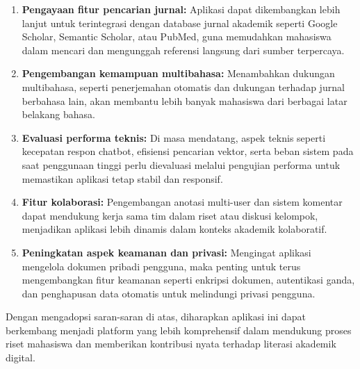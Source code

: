 \begin{enumerate}
  \item \textbf{Pengayaan fitur pencarian jurnal:} Aplikasi dapat dikembangkan lebih lanjut untuk terintegrasi dengan database jurnal akademik seperti Google Scholar, Semantic Scholar, atau PubMed, guna memudahkan mahasiswa dalam mencari dan mengunggah referensi langsung dari sumber terpercaya.

  \item \textbf{Pengembangan kemampuan multibahasa:} Menambahkan dukungan multibahasa, seperti penerjemahan otomatis dan dukungan terhadap jurnal berbahasa lain, akan membantu lebih banyak mahasiswa dari berbagai latar belakang bahasa.

  \item \textbf{Evaluasi performa teknis:} Di masa mendatang, aspek teknis seperti kecepatan respon chatbot, efisiensi pencarian vektor, serta beban sistem pada saat penggunaan tinggi perlu dievaluasi melalui pengujian performa untuk memastikan aplikasi tetap stabil dan responsif.

  \item \textbf{Fitur kolaborasi:} Pengembangan anotasi multi-user dan sistem komentar dapat mendukung kerja sama tim dalam riset atau diskusi kelompok, menjadikan aplikasi lebih dinamis dalam konteks akademik kolaboratif.

  \item \textbf{Peningkatan aspek keamanan dan privasi:} Mengingat aplikasi mengelola dokumen pribadi pengguna, maka penting untuk terus mengembangkan fitur keamanan seperti enkripsi dokumen, autentikasi ganda, dan penghapusan data otomatis untuk melindungi privasi pengguna.
\end{enumerate}

Dengan mengadopsi saran-saran di atas, diharapkan aplikasi ini dapat berkembang menjadi platform yang lebih komprehensif dalam mendukung proses riset mahasiswa dan memberikan kontribusi nyata terhadap literasi akademik digital.